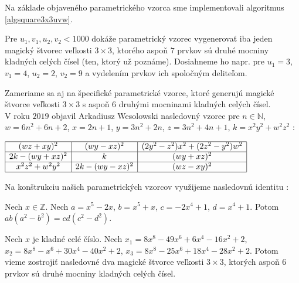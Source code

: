 Na základe objaveného parametrického vzorca sme implementovali algoritmus \ref{algsquare3x3uvw}.

\begin{result} Pre $u_1, v_1, u_2, v_2 < 1000$ dokáže parametrický vzorec vygenerovať iba jeden magický štvorec veľkosti $3 \times 3$, ktorého aspoň $7$ prvkov sú druhé mocniny kladných celých čísel (ten, ktorý už poznáme). Dosiahneme ho napr. pre $u_1 = 3$, $v_1 = 4$, $u_2 = 2$, $v_2 = 9$ a vydelením prvkov ich spoločným deliteľom.
\end{result}

Zameriame sa aj na špecifické parametrické vzorce, ktoré generujú magické štvorce veľkosti $3 \times 3$ s aspoň $6$ druhými mocninami kladných celých čísel. \\

V roku $2019$ objavil Arkadiusz Wesolowski nasledovný vzorec pre $n \in \mathbb{N}$, $w = 6n^2 + 6n + 2$, $x = 2n + 1$, $y = 3n^2 + 2n$, $z = 3n^2 + 4n + 1$, $k = x^2 y^2 + w^2 z^2$ \cite{multimagie}:

\begin{center}
$\begin{array}{ |c|c|c| } 
\hline
(wz + xy)^2 & (wy - xz)^2 & (2y^2 - z^2)x^2 + (2z^2 - y^2)w^2 \\ 
\hline
2k - (wy + xz)^2 & k & (wy + xz)^2 \\ 
\hline
x^2 z^2 + w^2 y^2 & 2k - (wy - xz)^2 & (wz - xy)^2 \\
\hline
\end{array}$
\end{center}

Na konštrukciu našich parametrických vzorcov využijeme nasledovnú identitu \cite{algebraic}:


\begin{lemma}
\label{square3x3x}
Nech $x \in \mathbb{Z}$. Nech $a = x^5 - 2x$, $b = x^5 + x$, $c = -2x^4 + 1$, $d = x^4 + 1$. Potom $ab(a^2 - b^2) = cd(c^2 - d^2)$.
\end{lemma}

\begin{theorem}
\label{3x3square6squares}
Nech $x$ je kladné celé číslo. Nech $x_1 = 8x^8 - 49x^6 + 6x^4 - 16x^2 + 2$, $x_2 = 8x^8 - x^6 + 30x^4 - 40x^2 + 2$, $x_3 = 8x^8 - 25x^6 + 18x^4 - 28x^2 + 2$. Potom vieme zostrojiť nasledovné dva magické štvorce veľkosti $3 \times 3$, ktorých aspoň $6$ prvkov sú druhé mocniny kladných celých čísel.
\end{theorem}


